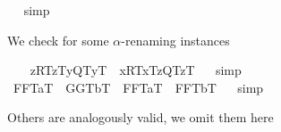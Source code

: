 \begin{isabellebody}
\isadelimproof
\ %
\endisadelimproof
%
\isatagproof
{}\isamarkupfalse%
\ simp\ \isamarkupfalse%
%
\endisatagproof
{\isafoldproof}%
%
\isadelimproof
%
\endisadelimproof
%
\isamarkuptrue%
%
\begin{isamarkuptext}%
We check for some $\alpha$-renaming instances%
\end{isamarkuptext}%
\isamarkuptrue%
\ \ \isamarkupfalse%
\ {\isachardoublequoteopen}{\isacharparenleft}\isactrlbold {\isasymlambda}z{\isachardot}{\isasymlparr}R\isactrlsup T{\isacharcomma}z\isactrlsup T{\isacharcomma}{\isacharparenleft}\isactrlbold {\isasymiota}y{\isachardot}{\isasymlparr}Q\isactrlsup T{\isacharcomma}y\isactrlsup T{\isasymrparr}{\isacharparenright}{\isasymrparr}{\isacharparenright}\ {\isacharequal}\ {\isacharparenleft}\isactrlbold {\isasymlambda}x{\isachardot}{\isasymlparr}R\isactrlsup T{\isacharcomma}x\isactrlsup T{\isacharcomma}{\isacharparenleft}\isactrlbold {\isasymiota}z{\isachardot}{\isasymlparr}Q\isactrlsup T{\isacharcomma}z\isactrlsup T{\isasymrparr}{\isacharparenright}{\isasymrparr}{\isacharparenright}{\isachardoublequoteclose}%
\isadelimproof
\ %
\endisadelimproof
%
\isatagproof
{}\isamarkupfalse%
\ simp\ \isamarkupfalse%
%
\endisatagproof
{\isafoldproof}%
%
\isadelimproof
%
\endisadelimproof
\isanewline
\ \ \isanewline
\ \ \isamarkupfalse%
\ {\isachardoublequoteopen}{\isacharparenleft}{\isacharparenleft}\isactrlbold {\isasymforall}F{\isachardot}{\isasymlparr}F\isactrlsup T{\isacharcomma}a\isactrlsup T{\isasymrparr}{\isacharparenright}\ \isactrlbold {\isasymequiv}\ {\isacharparenleft}\isactrlbold {\isasymforall}G{\isachardot}{\isasymlparr}G\isactrlsup T{\isacharcomma}b\isactrlsup T{\isasymrparr}{\isacharparenright}{\isacharparenright}\ {\isacharequal}\ {\isacharparenleft}\isactrlbold {\isasymforall}F{\isachardot}{\isasymlparr}F\isactrlsup T{\isacharcomma}a\isactrlsup T{\isasymrparr}{\isacharparenright}\ \isactrlbold {\isasymequiv}\ {\isacharparenleft}\isactrlbold {\isasymforall}F{\isachardot}{\isasymlparr}F\isactrlsup T{\isacharcomma}b\isactrlsup T{\isasymrparr}{\isacharparenright}{\isachardoublequoteclose}%
\isadelimproof
\ %
\endisadelimproof
%
\isatagproof
{}\isamarkupfalse%
\ simp\ \isamarkupfalse%
%
\endisatagproof
{\isafoldproof}%
%
\isadelimproof
%
\endisadelimproof
%
\begin{isamarkuptext}%
Others are analogously valid, we omit them here%
\end{isamarkuptext}%

\end{isabellebody}
